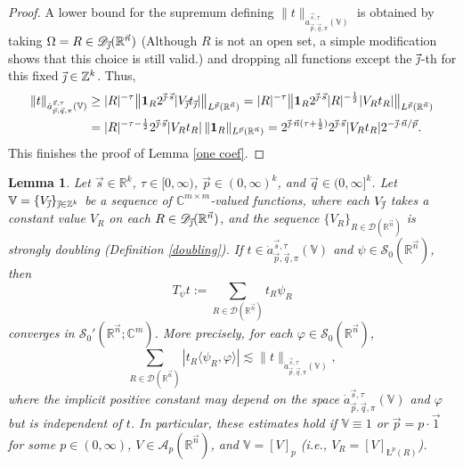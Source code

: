 \documentclass[11pt, reqno]{amsart}
\newtheorem{lemma}[theorem]{Lemma}
\theoremstyle{definition}
\theoremstyle{remark}
\numberwithin{equation}{section}
\newcommand{\A}{\mathscr A}
\newcommand{\C}{\mathbb C}
\newcommand{\D}{\mathscr D}
\newcommand{\R}{\mathbb R}
\newcommand{\Sc}{\mathscr S}
\newcommand{\V}{\mathbb V}
\newcommand{\Z}{\mathbb Z}
\newcommand{\vj}{\vec{\textit{\j}}}
\newcommand{\vn}{\vec n}
\newcommand{\vp}{\vec p}
\newcommand{\vq}{\vec q}
\newcommand{\vs}{\vec s}
\newcommand{\atau}{\dot a^{\vs,\tau}_{\vp,\vq,\pi}}
\newcommand{\one}{\mathbf{1}}
\newcommand{\aveL}{\textit{\L}}
\newcommand{\pair}[2]{\langle #1, #2 \rangle}
\newcommand{\abs}[1]{|#1|}
\newcommand{\Norm}[2]{\|#1\|_{#2}}
\newcommand{\bNorm}[2]{\big\|#1\big\|_{#2}}
\begin{document}
\begin{proof}
A lower bound for the supremum defining $\Norm{t}{\atau(\V)}$ is obtained by taking $\Omega=R\in\D_{\vj}(\R^{\vn})$ (Although $R$ is not an open set,
a simple modification shows that this choice is still valid.) and dropping all functions except the $\vj$-th for this fixed $\vj\in\Z^k$. Thus,
\begin{equation*}
\begin{split}
\Norm{t}{\atau(\V)}
&\geq\abs{R}^{-\tau}\bNorm{\one_R 2^{\vj\cdot\vs} |V_{\vj}t_{\vj}|}{L^{\vp}(\R^{\vn})}
=\abs{R}^{-\tau}\bNorm{\one_R 2^{\vj\cdot\vs} \abs{R}^{-\frac12} |V_Rt_R|}{L^{\vp}(\R^{\vn})} \\
&=\abs{R}^{-\tau-\frac12} 2^{\vj\cdot\vs} |V_Rt_R|\,
\Norm{\one_R }{L^{\vp}(\R^{\vn})}
=2^{\vj\cdot\vn(\tau+\frac12)} 2^{\vj\cdot\vs}\abs{V_R t_R}
2^{-\vj\cdot\vn/\vp}.
\end{split}
\end{equation*}
This finishes the proof of Lemma \ref{one coef}.
\end{proof}

\begin{lemma}\label{Tpsi welldef}
Let $\vs\in\R^k$, $\tau\in[0,\infty)$, $\vp\in(0,\infty)^k$, and $\vq\in(0,\infty]^k$.
Let $\V=\{V_{\vj}\}_{\vj\in\Z^k}$ be a sequence of $\C^{m\times m}$-valued functions, where each $V_{\vj}$ takes a constant value $V_R$ on each $R\in\D_{\vj}(\R^{\vn})$, and the sequence $\{V_R\}_{R\in\D(\R^{\vn})}$ is strongly doubling (Definition \ref{doubling}). If $t\in\atau(\V)$ and $\psi\in\Sc_0(\R^{\vn})$, then
\begin{equation*}
T_{\psi}t:=\sum_{R\in\D(\R^{\vn})}t_R\psi_R
\end{equation*}
converges in $\Sc_0'(\R^{\vn};\C^m)$. More precisely, for each $\varphi\in\Sc_0(\R^{\vn})$,
\begin{equation*}
\sum_{R\in\D(\R^{\vn})}\abs{t_R\pair{\psi_R}{\varphi}}
\lesssim \Norm{t}{\atau(\V)},
\end{equation*}
where the implicit positive constant may depend on the space $\atau(\V)$ and $\varphi$ but is independent of $t$.
In particular, these estimates hold
if $\V\equiv1$ or $\vp=p\cdot\vec1$ for some $p\in(0,\infty)$, $V\in\A_p(\R^{\vn})$,
and $\V=[V]_p$ (i.e., $V_R=[V]_{\aveL^p(R)}$).
\end{lemma}
\end{document}
